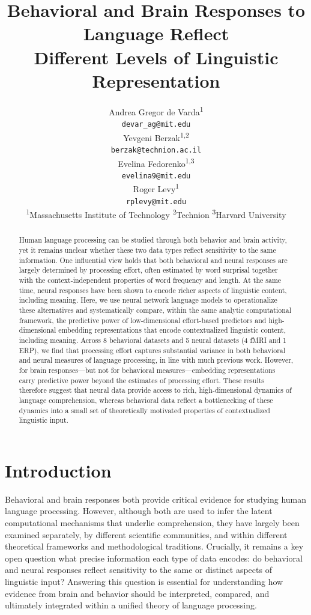 \documentclass[11pt]{article}
\title{Behavioral and Brain Responses to Language Reflect \\ Different Levels of Linguistic Representation}
\author{Andrea Gregor de Varda\textsuperscript{1} \\
    {\tt devar\_ag@mit.edu} \\\And
    Yevgeni Berzak\textsuperscript{1,2} \\
    {\tt berzak@technion.ac.il} \\ \AND
    Evelina Fedorenko\textsuperscript{1,3} \\
    {\tt evelina9@mit.edu} \\\And
    Roger Levy\textsuperscript{1} \\
    {\tt rplevy@mit.edu} \\ \AND
    {\normalfont  \textsuperscript{1}Massachusetts Institute of Technology \hspace{.4cm}
    \textsuperscript{2}Technion \hspace{.4cm} \textsuperscript{3}Harvard University}
}
\begin{document}
\maketitle
\begin{abstract}

Human language processing can be studied through both behavior and brain activity, yet it remains unclear whether these two data types reflect sensitivity to the same information. One influential view holds that both behavioral and neural responses are largely determined by processing effort, often estimated by word surprisal together with the context-independent properties of word frequency and length. At the same time, neural responses have been shown to encode richer aspects of linguistic content, including meaning. Here, we use neural network language models to operationalize these alternatives and systematically compare, within the same analytic computational framework, the predictive power of low-dimensional effort-based predictors and high-dimensional embedding representations that encode contextualized linguistic content, including meaning. Across 8 behavioral datasets and 5 neural datasets (4 fMRI and 1 ERP), we find that processing effort captures substantial variance in both behavioral and neural measures of language processing, in line with much previous work. However, for brain responses---but not for behavioral measures---embedding representations carry predictive power beyond the estimates of processing effort. These results therefore suggest that neural data provide access to rich, high-dimensional dynamics of language comprehension, whereas behavioral data reflect a bottlenecking of these dynamics into a small set of theoretically motivated properties of contextualized linguistic input.

\end{abstract}


\section{Introduction} \label{sec:intro}

Behavioral and brain responses both provide critical evidence for studying human language processing. However, although both are used to infer the latent computational mechanisms that underlie comprehension, they have largely been examined separately, by different scientific communities, and within different theoretical frameworks and methodological traditions. Crucially, it remains a key open question what precise information each type of data encodes: do behavioral and neural responses reflect sensitivity to the same or distinct aspects of linguistic input? Answering this question is essential for understanding how evidence from brain and behavior should be interpreted, compared, and ultimately integrated within a unified theory of language processing.
\end{document}
